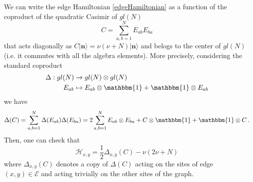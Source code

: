 \documentclass[10pt]{article}
\numberwithin{equation}{section}
\numberwithin{equation}{subsection}
\newcommand{\twoj}{\nu}
\begin{document}
We can write the edge Hamiltonian \eqref{edgeHamiltonian} as a function of the coproduct of the quadratic Casimir of $gl(N)$
\begin{equation}\label{secondCasimir}
    C=\sum_{a,b=1}^{N}E_{ab}E_{ba}
\end{equation}
that acts diagonally as $C|\bm{n}\rangle=\twoj(\twoj+N)|\bm{n}\rangle$ and belogs to the center of $gl(N)$ (i.e. it commutes with all the algebra elements).  
More precisely,  considering the standard coproduct 
\begin{equation}
\begin{split}
\Delta:gl(N)&\to gl(N)\otimes gl(N)\\
E_{ab}&\mapsto E_{ab}\otimes \mathbbm{1}+\mathbbm{1}\otimes E_{ab}
\end{split}
\end{equation}
we have 
\begin{equation}
\Delta(C)=\sum_{a,b=1}^{N}\Delta(E_{ab})\Delta(E_{ba})=2\sum_{a,b=1}^{N}E_{ab}\otimes E_{ba}+C\otimes \mathbbm{1}+\mathbbm{1}\otimes C\,.
\end{equation}
Then, one can check that 
\begin{equation}\label{hamiltonianCasimir}
	\mathcal{H}_{x,y}=\frac{1}{2}\Delta_{x,y}(C)-\twoj(2\twoj+N)
\end{equation}
where $\Delta_{x,y}(C)$ denotes a copy of $\Delta(C)$ acting on  the sites of edge $(x,y)\in \mathcal{E}$ and acting trivially on the other sites of the graph.
\end{document}
